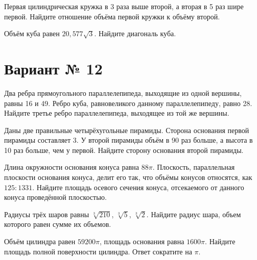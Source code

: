 \documentclass[4apaper]{article}
\begin{document}
\begin{taskBN}{5}
 Первая цилиндрическая кружка в 3 раза выше второй, а вторая в 5 раз шире первой. Найдите отношение объёма первой кружки к объёму второй.
\end{taskBN}

\begin{taskBN}{6}
Объём куба равен $20,577\sqrt{3}$. Найдите диагональ куба.
\end{taskBN}
\newpage\section*{Вариант № 12}

\begin{taskBN}{1}
Два ребра прямоугольного параллелепипеда, выходящие из одной вершины, равны 16 и 49. Ребро куба, равновеликого данному параллелепипеду, равно 28. Найдите третье ребро параллелепипеда, выходящее из той же вершины.
\end{taskBN}

\begin{taskBN}{2}
Даны две правильные четырёхугольные пирамиды. Сторона основания первой пирамиды составляет 3. У второй пирамиды объём в 90 раз больше, а высота в 10 раз больше, чем у первой. Найдите сторону основания второй пирамиды.
\end{taskBN}

\begin{taskBN}{3}
Длина окружности основания конуса равна $88\pi$. Плоскость, параллельная плоскости основания конуса,  делит его так, что объёмы конусов относятся, как $125:1331$. Найдите площадь осевого сечения конуса, отсекаемого от данного конуса проведённой плоскостью. 
\end{taskBN}

\begin{taskBN}{4}
Радиусы трёх шаров равны $\sqrt[3]{210}$, $\sqrt[3]{5}$, $\sqrt[3]{2}$. Найдите радиус шара, объем которого равен сумме их объемов.
\end{taskBN}

\begin{taskBN}{5}
Объём цилиндра равен $59200\pi$, площадь основания равна $1600\pi$. Найдите площадь полной поверхности цилиндра. Ответ сократите на $\pi$.
\end{taskBN}
\end{document}
